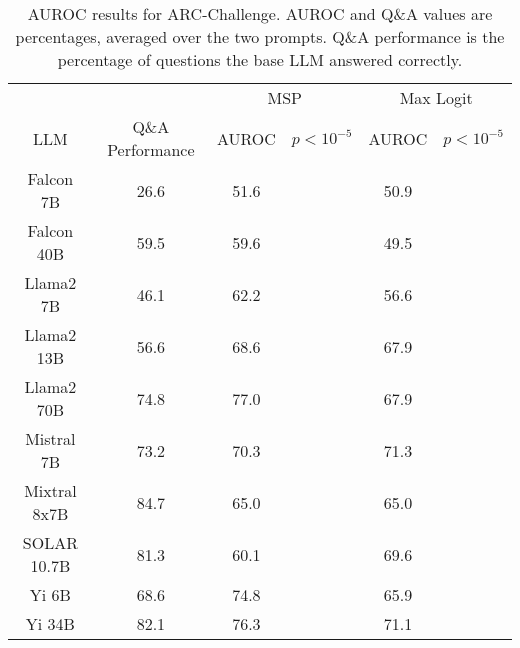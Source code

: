 \begin{table*}
\centering
\begin{tabular}{c|c|c|c|c|c}
& & \multicolumn{2}{c|}{MSP} & \multicolumn{2}{c}{Max Logit} \\ 
LLM & Q\&A Performance & AUROC & $p < 10^{-5}$ & AUROC & $p < 10^{-5}$\\ \hline
Falcon 7B & 26.6 & 51.6 &  & 50.9 & \\
Falcon 40B & 59.5 & 59.6 &  & 49.5 & \\
Llama2 7B & 46.1 & 62.2 &  & 56.6 & \\
Llama2 13B & 56.6 & 68.6 &  & 67.9 & \\
Llama2 70B & 74.8 & 77.0 &  & 67.9 & \\
Mistral 7B & 73.2 & 70.3 &  & 71.3 & \\
Mixtral 8x7B & 84.7 & 65.0 &  & 65.0 & \\
SOLAR 10.7B & 81.3 & 60.1 &  & 69.6 & \\
Yi 6B & 68.6 & 74.8 &  & 65.9 & \\
Yi 34B & 82.1 & 76.3 &  & 71.1 & \\
\hline
\end{tabular}
\caption{AUROC results for ARC-Challenge. AUROC and Q\&A values are percentages, averaged over the two prompts. Q\&A performance is the percentage of questions the base LLM answered correctly.}
\label{tab:arc_auroc}
\end{table*}
